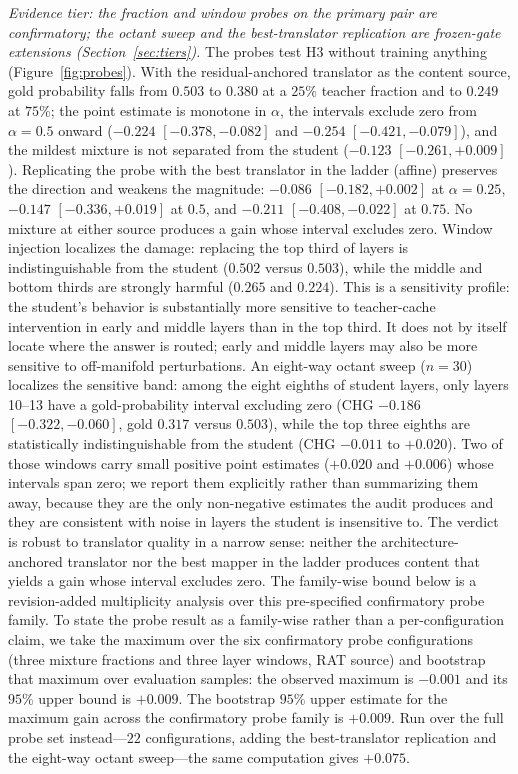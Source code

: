 \documentclass[10pt]{article}
\begin{document}
\emph{Evidence tier: the fraction and window probes on the primary pair are
confirmatory; the octant sweep and the best-translator replication are
frozen-gate extensions (Section~\ref{sec:tiers}).}
The probes test H3 without training anything (Figure~\ref{fig:probes}). With the
residual-anchored translator as the content source, gold probability falls from
$0.503$ to $0.380$ at a $25\%$ teacher fraction and to $0.249$ at $75\%$; the
point estimate is monotone in $\alpha$, the intervals exclude zero from
$\alpha{=}0.5$ onward ($-0.224$ $[-0.378, -0.082]$ and $-0.254$
$[-0.421, -0.079]$), and the mildest mixture is not separated from the student
($-0.123$ $[-0.261, +0.009]$). Replicating the probe with the best translator in
the ladder (affine) preserves the direction and weakens the magnitude: $-0.086$
$[-0.182, +0.002]$ at $\alpha{=}0.25$, $-0.147$ $[-0.336, +0.019]$ at $0.5$, and
$-0.211$ $[-0.408, -0.022]$ at $0.75$. No mixture at either source produces a
gain whose interval excludes zero. Window injection localizes the damage:
replacing the top third of layers is indistinguishable from the student
($0.502$ versus $0.503$), while the middle and bottom thirds are strongly
harmful ($0.265$ and $0.224$). This is a sensitivity profile: the student's
behavior is substantially more sensitive to teacher-cache intervention in
early and middle layers than in the top third. It does not by itself locate
where the answer is routed; early and middle layers may also be more sensitive
to off-manifold perturbations. An eight-way octant sweep ($n{=}30$)
localizes the sensitive band: among the eight eighths of student layers, only
layers 10--13 have a gold-probability interval excluding zero (CHG $-0.186$
$[-0.322, -0.060]$, gold $0.317$ versus $0.503$), while the top three eighths
are statistically indistinguishable from the student (CHG $-0.011$ to
$+0.020$). Two of those windows carry small positive point estimates
($+0.020$ and $+0.006$) whose intervals span zero; we report them explicitly
rather than summarizing them away, because they are the only non-negative
estimates the audit produces and they are consistent with noise in layers the
student is insensitive to. The verdict is robust to translator quality in a
narrow sense: neither the architecture-anchored translator nor the best mapper
in the ladder produces content that yields a gain whose interval excludes zero.
The family-wise bound below is a revision-added multiplicity analysis over this pre-specified
confirmatory probe family. To state the probe result as a family-wise rather than a per-configuration claim, we take
the maximum over the six confirmatory probe configurations (three mixture
fractions and three layer windows, RAT source) and bootstrap that maximum over
evaluation samples: the observed maximum is $-0.001$ and its $95\%$ upper bound
is $+0.009$. The bootstrap $95\%$ upper estimate for the maximum gain across the confirmatory probe family is $+0.009$. Run over the full probe set instead---$22$ configurations, adding the
best-translator replication and the eight-way octant sweep---the same
computation gives $+0.075$.
\end{document}

